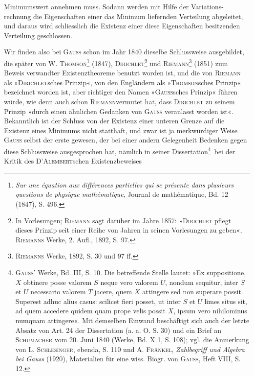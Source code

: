 Minimumswert annehmen muss. Sodann werden mit Hilfe der Variations\mbox{-}
\clearpage{}
\noindent rechnung die Eigenschaften einer das Minimum liefernden Verteilung abgeleitet, und daraus wird schliesslich die Existenz einer diese Eigenschaften besitzenden Verteilung geschlossen.
\par\noindent\hspace*{\parindent}Wir finden also bei \textsc{Gauss} schon im Jahr 1840 dieselbe Schlussweise
ausgebildet, die später von W. \textsc{Thomson}\footnote{\textit{Sur une équation aux différences partielles qui se présente dans plusieurs questions de physique
mathématique}, Journal de mathématique, Bd. 12 (1847), S. 496.} (1847), \textsc{Dirichlet}\footnote{In Vorlesungen; \textsc{Riemann} sagt darüber im Jahre 1857: »\textsc{Dirichlet} pflegt dieses Prinzip seit einer
Reihe von Jahren in seinen Vorlesungen zu geben«, \textsc{Riemanns} Werke, 2. Aufl., 1892, S. 97.} und \textsc{Riemann}\footnote{\textsc{Riemanns} Werke, 1892, S. 30 und 97 ff.}
(1851) zum Beweis verwandter Existenztheoreme benutzt worden ist, und die
von \textsc{Riemann} als »\textsc{Dirichlet}sches Prinzip«, von den Engländern als »\textsc{Thomson}sches Prinzip« bezeichnet worden ist, aber richtiger den Namen »\textsc{Gauss}sches
Prinzip« führen würde, wie denn auch schon \textsc{Riemann}\footnotemark[3] vermutet hat, dass
\textsc{Dirichlet} zu seinem Prinzip »durch einen ähnlichen Gedanken von \textsc{Gauss}
veranlasst worden ist«. Bekanntlich ist der Schluss von der Existenz einer
unteren Grenze auf die Existenz eines Minimums nicht statthaft, und zwar ist
ja merkwürdiger Weise \textsc{Gauss} selbst der erste gewesen, der bei einer andern
Gelegenheit Bedenken gegen diese Schlussweise ausgesprochen hat, nämlich
in seiner Dissertation\begingroup\renewcommand{\thefootnote}{4a)}\footnote{\textsc{Gauss}' Werke, Bd. III, S. 10. Die betreffende Stelle lautet: »Ex suppositione, $X$ obtinere posse
valorem $S$ neque vero valorem $U$, nondum sequitur, inter $S$ et $U$ necessario valorem $T$ jacere, quem $X$
attingere sed non superare possit. Superest adhuc alius casus: scilicet fieri posset, ut inter $S$ et $U$ limes
situs sit, ad quem accedere quidem quam prope velis possit $X$, ipsum vero nihilominus numquam attingere«.
Mit demselben Einwand beschäftigt sich auch der letzte Absatz von Art. 24 der Dissertation (a. a. O. S. 30)
und ein Brief an \textsc{Schumacher} vom 20. Juni 1840 (Werke, Bd. X 1, S. 108); vgl. die Anmerkung von L. \textsc{Schlesinger}, ebenda, S. 110 und A. \textsc{Fränkel}, \textit{Zahlbegriff und Algebra bei Gauss} (1920), Materialien für eine wiss.
Biogr. von \textsc{Gauss}, Heft VIII, S. 12.}\endgroup\setcounter{footnote}{4}\ bei der Kritik des \textsc{D'Alembert}schen Existenzbeweises
